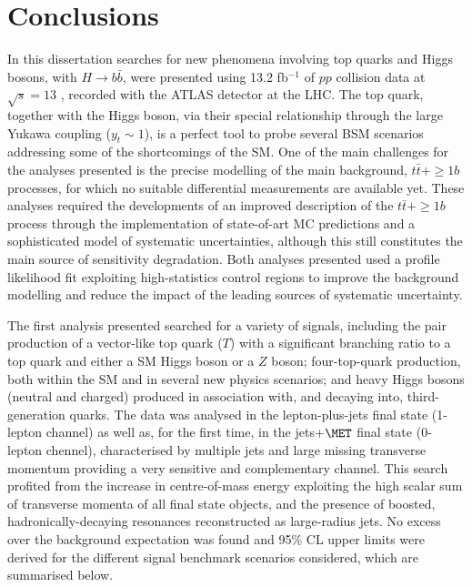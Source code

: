 \chapter*{Conclusions}

\leavevmode{\parindent=1em\indent} In this dissertation searches for new phenomena involving top quarks and Higgs bosons, with $H\to b\bar{b}$, were presented using 13.2 fb$^{-1}$ of $pp$ collision data at $\sqrt{s}= 13$ \tev, recorded with the ATLAS detector at the LHC. The top quark, together with the Higgs boson, via their special relationship through the large Yukawa coupling ($y_{t}\sim1$), is a perfect tool to probe several BSM scenarios addressing some of the shortcomings of the SM. 
One of the main challenges for the analyses presented is the precise modelling of the main background, $t\bar{t}+\ge1b$ processes, for which no suitable differential measurements are available yet. These analyses required the developments of an improved description of the $t\bar{t}+\ge1b$ process through the implementation of state-of-art MC predictions and a sophisticated model of systematic uncertainties, although this still constitutes the main source of sensitivity degradation. Both analyses presented used a profile likelihood fit exploiting high-statistics control regions to improve the background modelling and reduce the impact of the leading sources of systematic uncertainty.\par
The first analysis presented searched for a variety of signals, including the pair production of a vector-like top quark ($T$) with a significant branching ratio to a top quark and either a SM Higgs boson or a $Z$ boson; four-top-quark production, both within the SM and in several new physics scenarios; and heavy Higgs bosons (neutral and charged) produced in association with, and decaying into, third-generation quarks. The data was analysed in the lepton-plus-jets final state (1-lepton channel) as well as, for the first time, in the jets+$\MET$ final state (0-lepton chennel), characterised by multiple jets and large missing transverse momentum providing a very sensitive and complementary channel. This search profited from the increase in centre-of-mass energy exploiting the high scalar sum of transverse momenta of all final state objects, and the presence of boosted, hadronically-decaying resonances reconstructed as large-radius jets.
No excess over the background expectation was found and 95\% CL upper limits were derived for the different signal benchmark scenarios considered, which are summarised below. \par
